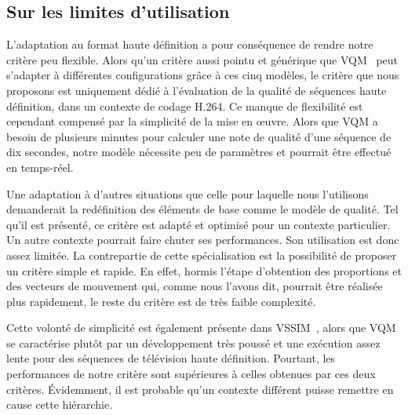 \subsection{Sur les limites d'utilisation}
L'adaptation au format haute définition a pour conséquence de rendre notre critère peu flexible. Alors qu'un critère aussi pointu et générique que VQM~\cite{wolf-vqmtech,wolf-vpqm2007} peut s'adapter à différentes configurations grâce à ces cinq modèles, le critère que nous proposons est uniquement dédié à l'évaluation de la qualité de séquences haute définition, dans un contexte de codage H.264. Ce manque de flexibilité est cependant compensé par la simplicité de la mise en \oe uvre. Alors que VQM a besoin de plusieurs minutes pour calculer une note de qualité d'une séquence de dix secondes, notre modèle nécessite peu de paramètres et pourrait être effectué en temps-réel.

Une adaptation à d'autres situations que celle pour laquelle nous l'utilisons demanderait la redéfinition des éléments de base comme le modèle de qualité. Tel qu'il est présenté, ce critère est adapté et optimisé pour un contexte particulier. Un autre contexte pourrait faire chuter ses performances. Son utilisation est donc assez limitée. La contrepartie de cette spécialisation est la possibilité de proposer un critère simple et rapide. En effet, hormis l'étape d'obtention des proportions et des vecteurs de mouvement qui, comme nous l'avons dit, pourrait être réalisée plus rapidement, le reste du critère est de très faible complexité.

Cette volonté de simplicité est également présente dans VSSIM~\cite{wang-vqasdm}, alors que VQM~\cite{wolf-vqmtech} se caractérise plutôt par un développement très poussé et une exécution assez lente pour des séquences de télévision haute définition. Pourtant, les performances de notre critère sont supérieures à celles obtenues par ces deux critères. Évidemment, il est probable qu'un contexte différent puisse remettre en cause cette hiérarchie.


